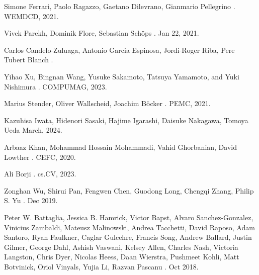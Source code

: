 \documentclass{report} %
\begin{document}
\begin{thebibliography}{00}
    \newblock Simone Ferrari, Paolo Ragazzo, Gaetano Dilevrano, Gianmario Pellegrino
    .
    \newblock WEMDCD, 2021.

    \newblock Vivek Parekh, Dominik Flore, Sebastian Schöps
    .
    \newblock Jan 22, 2021.

    \newblock Carlos Candelo-Zuluaga, Antonio Garcia Espinosa, Jordi-Roger Riba, Pere Tubert Blanch
    .
    
    \newblock Yihao Xu, Bingnan Wang, Yusuke Sakamoto, Tatsuya Yamamoto, and Yuki Nishimura
    .
    \newblock COMPUMAG, 2023.

    \newblock Marius Stender, Oliver Wallscheid, Joachim Böcker
    .
    \newblock PEMC, 2021.

    \newblock Kazuhisa Iwata, Hidenori Sasaki, Hajime Igarashi, Daisuke Nakagawa, Tomoya Ueda
     March, 2024.
    
    \newblock Arbaaz Khan, Mohammad Hossain Mohammadi, Vahid Ghorbanian, David Lowther
    .
    \newblock CEFC, 2020.

    \newblock Ali Borji
    .
    \newblock cs.CV, 2023.

    \newblock Zonghan Wu, Shirui Pan, Fengwen Chen, Guodong Long, Chengqi Zhang, Philip S. Yu
    .
     Dec 2019.

    \newblock Peter W. Battaglia, Jessica B. Hamrick, Victor Bapst, Alvaro Sanchez-Gonzalez, Vinicius Zambaldi, Mateusz Malinowski, Andrea Tacchetti, David Raposo, 
    Adam Santoro, Ryan Faulkner, Caglar Gulcehre, Francis Song, Andrew Ballard, Justin Gilmer, George Dahl, Ashish Vaswani, Kelsey Allen, Charles Nash,
    Victoria Langston, Chris Dyer, Nicolas Heess, Daan Wierstra, Pushmeet Kohli, Matt Botvinick, Oriol Vinyals, Yujia Li, Razvan Pascanu
    .
     Oct 2018.


\end{thebibliography}
\end{document}
